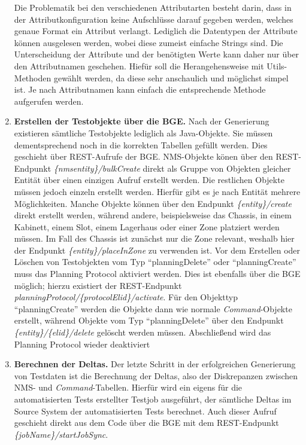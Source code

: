 \begin{enumerate}
    Die Problematik bei den verschiedenen Attributarten besteht darin, dass in der Attributkonfiguration keine Aufschlüsse darauf gegeben werden, welches genaue Format ein Attribut verlangt. Lediglich die Datentypen der Attribute können ausgelesen werden, wobei diese zumeist einfache Strings sind. Die Unterscheidung der Attribute und der benötigten Werte kann daher nur über den Attributnamen geschehen. Hiefür soll die Herangehensweise mit Utils-Methoden gewählt werden, da diese sehr anschaulich und möglichst simpel ist. Je nach Attributnamen kann einfach die entsprechende Methode aufgerufen werden.
    \item \textbf{Erstellen der Testobjekte über die \ac{BGE}.} Nach der Generierung existieren sämtliche Testobjekte lediglich als Java-Objekte. Sie müssen dementsprechend noch in die korrekten Tabellen gefüllt werden. Dies geschieht über \ac{REST}-Aufrufe der \ac{BGE}. \ac{NMS}-Objekte könen über den \ac{REST}-Endpunkt \textit{\{nmsentity\}/bulkCreate} direkt als Gruppe von Objekten gleicher Entität über einen einzigen Aufruf erstellt werden. Die restlichen Objekte müssen jedoch einzeln erstellt werden. Hierfür gibt es je nach Entität mehrere Möglichkeiten. Manche Objekte können über den Endpunkt \textit{\{entity\}/create} direkt erstellt werden, während andere, beispielsweise das Chassis, in einem Kabinett, einem Slot, einem Lagerhaus oder einer Zone platziert werden müssen. Im Fall des Chassis ist zunächst nur die Zone relevant, weshalb hier der Endpunkt \textit{\{entity\}/placeInZone} zu verwenden ist. Vor dem Erstellen oder Löschen von Testobjekten vom Typ \enquote{planningDelete} oder \enquote{planningCreate} muss das Planning Protocol aktiviert werden. Dies ist ebenfalls über die \ac{BGE} möglich; hierzu existiert der \ac{REST}-Endpunkt \textit{planningProtocol/\{protocolElid\}/activate}. Für den Objekttyp \enquote{planningCreate} werden die Objekte dann wie normale \textit{Command}-Objekte erstellt, während Objekte vom Typ \enquote{planningDelete} über den Endpunkt \textit{\{entity\}/\{elid\}/delete} gelöscht werden müssen. Abschließend wird das Planning Protocol wieder deaktiviert
    \item \textbf{Berechnen der Deltas.} Der letzte Schritt in der erfolgreichen Generierung von Testdaten ist die Berechnung der Deltas, also der Diskrepanzen zwischen \ac{NMS}- und \textit{Command}-Tabellen. Hierfür wird ein eigens für die automatisierten Tests erstellter Testjob ausgeführt, der sämtliche Deltas im Source System der automatisierten Tests berechnet. Auch dieser Aufruf geschieht direkt aus dem Code über die \ac{BGE} mit dem \ac{REST}-Endpunkt \textit{\{jobName\}/startJobSync}. 
\end{enumerate}


